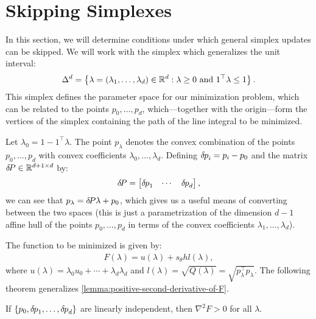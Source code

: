 \documentclass[eikonal.tex]{subfiles}
\begin{document}
\section{Skipping Simplexes}

In this section, we will determine conditions under which general
simplex updates can be skipped. We will work with the simplex which
generalizes the unit interval:
\begin{align*}
  \Delta^d = \left\{\lambda = (\lambda_1, \hdots, \lambda_d) \in \mathbb{R}^d : \lambda \geq 0 \mbox{ and } 1^\top \lambda \leq 1\right\}.
\end{align*}
This simplex defines the parameter space for our minimization problem,
which can be related to the points $p_0, \hdots, p_d$,
which---together with the origin---form the vertices of the simplex
containing the path of the line integral to be minimized.

Let $\lambda_0 = 1 - 1^\top \lambda$. The point $p_\lambda$ denotes
the convex combination of the points $p_0, \hdots, p_d$ with convex
coefficients $\lambda_0, \hdots, \lambda_d$. Defining
${\delta \hspace{-0.08em} p}_i = p_i - p_0$ and the matrix
${\delta \hspace{-0.14em} P} \in \mathbb{R}^{d + 1 \times d}$ by:
\begin{align*}
  {\delta \hspace{-0.14em} P} = \begin{bmatrix} {\delta \hspace{-0.08em} p}_1 & \cdots & {\delta \hspace{-0.08em} p}_d \end{bmatrix},
\end{align*}
we can see that $p_\lambda = {\delta \hspace{-0.14em} P} \lambda + p_0$, which gives us a
useful means of converting between the two spaces (this is just a
parametrization of the dimension $d - 1$ affine hull of the points
$p_0, \hdots, p_d$ in terms of the convex coefficients
$\lambda_1, \hdots, \lambda_d$).

The function to be minimized is
given by:
\begin{align*}
  F(\lambda) = u(\lambda) + s_\theta h l(\lambda),
\end{align*}
where $u(\lambda) = \lambda_0 u_0 + \cdots + \lambda_d \lambda_d$ and
$l(\lambda) = \sqrt{Q(\lambda)} = \sqrt{p_\lambda^\top
  p_\lambda}$. The following theorem generalizes
\cref{lemma:positive-second-derivative-of-F}.

\begin{theorem}
  If $\left\{p_0, {\delta \hspace{-0.08em} p}_1, \hdots, {\delta \hspace{-0.08em} p}_d\right\}$ are linearly
  independent, then $\nabla^2 F > 0$ for all $\lambda$.
\end{theorem}
\end{document}
